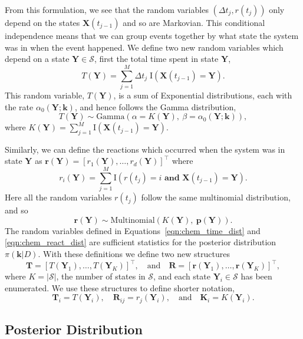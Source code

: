 \documentclass[final]{siamltex}
\begin{document}
From this formulation, we see that the random variables $(\Delta t_j, r(t_j))$ only depend on the states $\mathbf{X}(t_{j-1})$ and so are Markovian. This conditional independence means that we can group events together by what state the system was in when the event happened. We define two new random variables which depend on a state $\mathbf{Y} \in \mathcal{S}$, first the total time spent in state $\mathbf{Y}$,
\[
	T(\mathbf{Y}) = \sum\limits_{j=1}^M \Delta t_j\; \text{I}(\mathbf{X}(t_{j-1}) = \mathbf{Y}).
\]
This random variable, $T(\mathbf{Y})$, is a sum of Exponential distributions, each with the rate $\alpha_0(\mathbf{Y};\mathbf{k})$, and hence follows the Gamma distribution,
\begin{equation}\label{eqn:chem_time_dist}
	T(\mathbf{Y}) \sim \text{Gamma}\left(\alpha=K(\mathbf{Y}),~\beta = \alpha_0(\mathbf{Y}; \mathbf{k})\right),
\end{equation}
where $K(\mathbf{Y}) = \sum\limits_{j=1}^M \text{I}(\mathbf{X}(t_{j-1}) = \mathbf{Y})$.

Similarly, we can define the reactions which occurred when the system was in state $\mathbf{Y}$ as $\mathbf{r}(\mathbf{Y}) = [r_1(\mathbf{Y}), \ldots, r_d(\mathbf{Y})]^\top$ where
\[
	r_i(\mathbf{Y}) = \sum\limits_{j=1}^M \text{I}(r(t_j) = i \textbf{ and }\mathbf{X}(t_{j-1}) = \mathbf{Y}).
\]
Here all the random variables $r(t_j)$ follow the same multinomial distribution, and so
\begin{equation}\label{eqn:chem_react_dist}
	\mathbf{r}(\mathbf{Y}) \sim \text{Multinomial}(K(\mathbf{Y}),~\mathbf{p}(\mathbf{Y})). 
\end{equation}
The random variables defined in Equations~\eqref{eqn:chem_time_dist} and \eqref{eqn:chem_react_dist} are sufficient statistics for the posterior distribution $\pi(\mathbf{k}|D)$. With these definitions we define two new structures
\[
	\mathbf{T} = [T(\mathbf{Y}_1), \dots, T(\mathbf{Y}_K)]^\top, \quad \text{and} \quad \mathbf{R} = [\mathbf{r}(\mathbf{Y}_1), \dots, \mathbf{r}(\mathbf{Y}_K)]^\top,
\]
where $K = |\mathcal{S}|$, the number of states in $\mathcal{S}$, and each state $\mathbf{Y}_i \in \mathcal{S}$ has been enumerated. We use these structures to define shorter notation,
\[
	\mathbf{T}_i = T(\mathbf{Y}_i), \quad \mathbf{R}_{ij} = r_j(\mathbf{Y}_i), \quad \text{and} \quad \mathbf{K}_i = K(\mathbf{Y}_i).
\]

\subsection{Posterior Distribution}\label{sec:chem_stoch_posterior}
\end{document}
